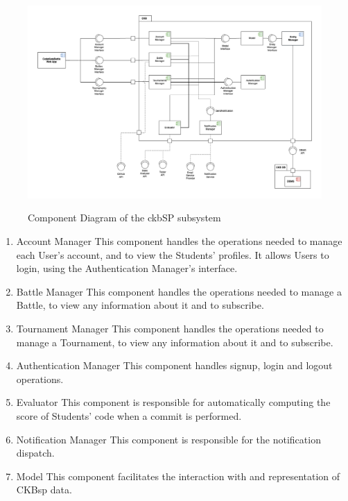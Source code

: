 \documentclass{Configuration_Files/Template}
\begin{document}
\begin{figure}[H]
\centering
\includegraphics[scale = 0.3]{Images/diagrams/ComponentViewCKBSP.png}\\
\caption{Component Diagram of the ckbSP subsystem}
\end{figure}

\begin{enumerate}
    \item \textcolor{bluepoli}{Account Manager} This component handles the operations needed to manage each User's account, and to view the Students' profiles. It allows Users to login, using the Authentication Manager's interface.
    \item \textcolor{bluepoli}{Battle Manager} This component handles the operations needed to manage a Battle, to view any information about it and to subscribe.
    \item \textcolor{bluepoli}{Tournament Manager} This component handles the operations needed to manage a Tournament, to view any information about it and to subscribe.
    \item \textcolor{bluepoli}{Authentication Manager} This component handles signup, login and logout operations.
    \item \textcolor{bluepoli}{Evaluator} This component is responsible for automatically computing the score of Students' code when a commit is performed. 
    \item \textcolor{bluepoli}{Notification Manager} This component is responsible for the notification dispatch.
    \item \textcolor{bluepoli}{Model} This component facilitates the interaction with and representation of CKBsp data.
\end{enumerate}
\end{document}
